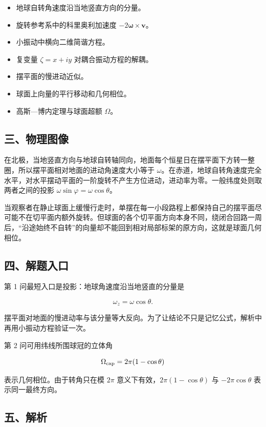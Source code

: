 \documentclass[12pt,a4paper,UTF8]{ctexart}
\newcommand{\tightlist}{\setlength{\itemsep}{0pt}\setlength{\parskip}{0pt}}
\begin{document}
\begin{itemize}
\tightlist
\item
  地球自转角速度沿当地竖直方向的分量。
\item
  旋转参考系中的科里奥利加速度 \(-2\bm\omega\times\bm v\)。
\item
  小振动中横向二维简谐方程。
\item
  复变量 \(\zeta=x+iy\) 对耦合振动方程的解耦。
\item
  摆平面的慢进动近似。
\item
  球面上向量的平行移动和几何相位。
\item
  高斯---博内定理与球面超额 \(\Omega\)。
\end{itemize}

\subsection{三、物理图像}\label{ux4e09ux7269ux7406ux56feux50cf-5}

在北极，当地竖直方向与地球自转轴同向，地面每个恒星日在摆平面下方转一整圈，所以摆平面相对地面的进动角速度大小等于
\(\omega\)。在赤道，地球自转角速度完全水平，对水平摆动平面的一阶旋转不产生方位进动，进动率为零。一般纬度处则取两者之间的投影
\(\omega\sin\varphi=\omega\cos\theta\)。

当观察者在静止球面上缓慢行走时，单摆在每一小段路程上都保持自己的摆平面尽可能不在切平面内额外旋转。但球面的各个切平面方向本身不同，绕闭合回路一周后，``沿途始终不自转''的向量却不能回到相对局部标架的原方向，这就是球面几何相位。

\subsection{四、解题入口}\label{ux56dbux89e3ux9898ux5165ux53e3-5}

第 1 问最短入口是投影：地球角速度沿当地竖直的分量是

\[
\omega_z=\omega\cos\theta.
\]

摆平面对地面的慢进动率与该分量等大反向。为了让结论不只是记忆公式，解析中再用小振动方程验证一次。

第 2 问可用纬线所围球冠的立体角

\[
\Omega_{\rm cap}=2\pi(1-\cos\theta)
\]

表示几何相位。由于转角只在模 \(2\pi\) 意义下有效，\(2\pi(1-\cos\theta)\)
与 \(-2\pi\cos\theta\) 表示同一最终方向。

\subsection{五、解析}\label{ux4e94ux89e3ux6790-5}
\end{document}
